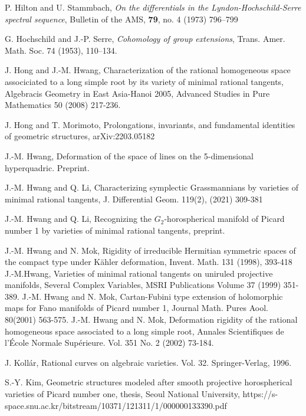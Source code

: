 \documentclass[12pt]{amsart}
\theoremstyle{plain}
\theoremstyle{definition}
\begin{document}
\begin{thebibliography}{}

 P. Hilton and U. Stammbach, \emph{On the differentials in the Lyndon-Hochschild-Serre spectral sequence}, Bulletin of the AMS, {\bf 79}, no. 4 (1973) 796--799


 G. Hochschild and J.-P. Serre, \emph{Cohomology of group extensions}, Trans. Amer. Math.
Soc. 74 (1953), 110--134.

J. Hong and J.-M. Hwang, Characterization of the rational homogeneous space associciated to a long simple root by its variety of minimal rational tangents, Algebracis Geometry in East Asia-Hanoi 2005, Advanced Studies in Pure Mathematics 50 (2008) 217-236.

 J. Hong and T. Morimoto, Prolongations, invariants, and fundamental identities of geometric structures, arXiv:2203.05182

 J.-M.  Hwang,  Deformation of the space of lines on the 5-dimensional hyperquadric. Preprint.

 J.-M. Hwang and Q. Li, Characterizing symplectic Grassmannians by varieties of minimal rational tangents, J. Differential Geom. 119(2), (2021) 309-381

 J.-M. Hwang and Q. Li, Recognizing the $G_2$-horospherical manifold of Picard number 1 by varieties of minimal rational tangents, preprint.

 J.-M. Hwang and N. Mok, Rigidity of irreducible Hermitian symmetric spaces of the compact type under K\"ahler deformation, Invent. Math. 131 (1998), 393-418
J.-M.Hwang, Varieties of minimal rational tangents on uniruled projective manifolds, Several Complex Variables, MSRI Publications Volume 37 (1999) 351-389.
J.-M. Hwang and N. Mok, Cartan-Fubini type extension of holomorphic maps for Fano manifolds of Picard number 1, Journal Math. Pures Aool. 80(2001) 563-575.
J.-M. Hwang and N. Mok, Deformation rigidity of the rational homogeneous space associated to a long simple root, Annales Scientifiques de l’École Normale Supérieure. Vol. 351 No. 2 (2002) 73-184.

 J.  Koll\'ar,  Rational curves on algebraic varieties. Vol. 32. Springer-Verlag, 1996.

 S.-Y. Kim, Geometric structures modeled after smooth projective horospherical varieties of Picard number one, thesis, Seoul National University, https://s-space.snu.ac.kr/bitstream/10371/121311/1/000000133390.pdf


\end{thebibliography}
\end{document}
